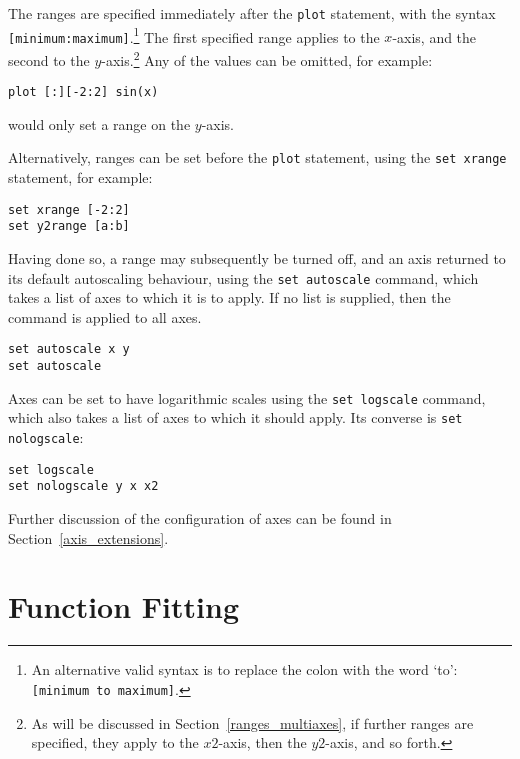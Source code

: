 \documentclass[a4paper,onecolumn,11pt]{book}
\begin{document}
\noindent The ranges are specified immediately after the \texttt{plot}
statement, with the syntax \texttt{[minimum:maximum]}.\footnote{An alternative
valid syntax is to replace the colon with the word `to': \texttt{[minimum to
maximum]}.} The first specified range applies to the $x$-axis, and the second
to the $y$-axis.\footnote{As will be discussed in
Section~\ref{ranges_multiaxes}, if further ranges are specified, they apply to
the $x2$-axis, then the $y2$-axis, and so forth.} Any of the values can be
omitted, for example:

\begin{verbatim}
plot [:][-2:2] sin(x)
\end{verbatim}

\noindent would only set a range on the $y$-axis.

Alternatively, ranges can be set before the \texttt{plot} statement, using the
\texttt{set xrange}
statement, for example:

\begin{verbatim}
set xrange [-2:2]
set y2range [a:b]
\end{verbatim}

Having done so, a range may subsequently be turned off, and an axis returned to
its default autoscaling behaviour, using the \texttt{set autoscale} command, which takes a list
of axes to which it is to apply. If no list is supplied, then the command is
applied to all axes.

\begin{verbatim}
set autoscale x y
set autoscale
\end{verbatim}

Axes can be set to have logarithmic scales using the \texttt{set
logscale} command,
which also takes a list of axes to which it should apply. Its converse is
\texttt{set nologscale}:

\begin{verbatim}
set logscale
set nologscale y x x2
\end{verbatim}

Further discussion of the configuration of axes can be found in
Section~\ref{axis_extensions}.

\section{Function Fitting}
\label{fit_command}
\end{document}
